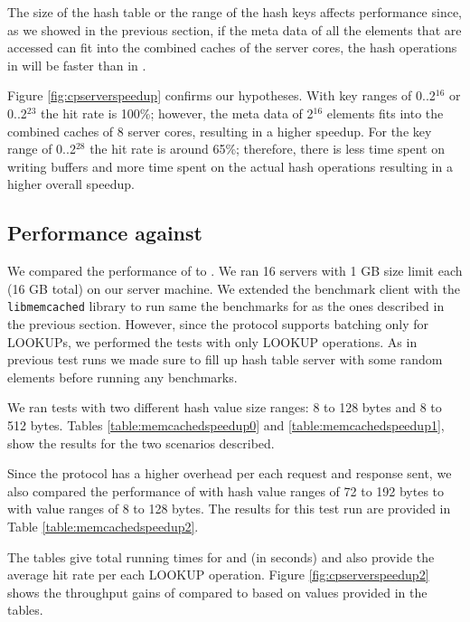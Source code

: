 The size of the hash table or the range of the hash keys affects performance since, as we showed in the previous section, if the meta data of all the elements 
that are accessed can fit into the combined caches of the server cores, the hash operations in \cphash{} will be faster than in \lockhash{}.

Figure \ref{fig:cpserverspeedup} confirms our hypotheses. With key ranges of 0..2$^{16}$ or 0..2$^{23}$ the hit rate is 100\%; however, the meta data of 
2$^{16}$ elements fits into the combined caches of 8 server cores, resulting in a higher speedup. For the key range of 0..2$^{28}$ the hit rate is around 65\%; 
therefore, there is less time spent on writing buffers and more time spent on the actual hash operations resulting in a higher overall speedup.

\subsection{Performance against \memcached{}}
We compared the performance of \cpserver{} to \memcached{}. We ran 16 \memcached{} servers with 1 GB size limit each (16 GB total) on our server machine.
We extended the benchmark client with the \texttt{libmemcached} library \cite{libmemcached} to run same the benchmarks for \memcached{} as the ones described in
the previous section. However, since the \memcached{} protocol supports batching only for LOOKUPs, we performed the tests with only LOOKUP operations. As in previous 
test runs we made sure to fill up hash table server with some random elements before running any benchmarks. 

We ran tests with two different hash value size ranges: 8 to 128 bytes and 8 to 512 bytes. 
Tables \ref{table:memcachedspeedup0} and \ref{table:memcachedspeedup1}, show the results for the two scenarios described.

Since the \memcached{} protocol has a higher overhead per each request and response sent, we also compared the performance of \cpserver{} with hash value 
ranges of 72 to 192 bytes to \memcached{} with value ranges of 8 to 128 bytes. The results for this test run are provided in Table \ref{table:memcachedspeedup2}.

The tables give total running times for \cpserver{} and \memcached{} (in seconds) and also provide the average hit rate per each LOOKUP operation.
Figure \ref{fig:cpserverspeedup2} shows the throughput gains of \cpserver{} compared to \memcached{} based on values provided in the tables. 

